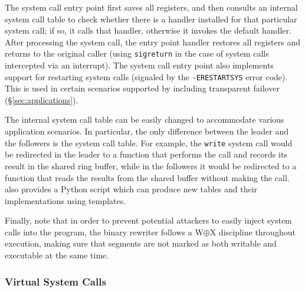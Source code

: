 The system call entry point first saves all registers, and then
consults an internal system call table to check whether there is a
handler installed for that particular system call; if so, it calls
that handler, otherwise it invokes the default handler.  After
processing the system call, the entry point handler restores all
registers and returns to the original caller (using
\lstinline`sigreturn` in the case of system calls intercepted via an
interrupt). The system call entry point also implements support for
restarting system calls (\ie signaled by the \lstinline`-ERESTARTSYS`
error code). This is used in certain scenarios supported by \varan
including transparent failover (\S\ref{sec:applications}).

The internal system call table can be easily changed to accommodate
various application scenarios.  In particular, the only difference
between the leader and the followers is the system call table. For
example, the \lstinline`write` system call would be redirected in the leader
to a function that performs the call and records its result in the
shared ring buffer, while in the followers it would be redirected to a
function that reads the results from the shared buffer without making
the call.
\varan  also provides a Python script which can produce new tables
and their implementations using templates.

Finally, note that in order to prevent potential attackers to easily inject
system calls into the program, the binary rewriter follows a
W$\mathbin{\oplus}$X discipline throughout execution, making sure that
segments are not marked as both writable and executable at the same
time.


\subsubsection{Virtual System Calls}
\label{sec:vsyscall}

